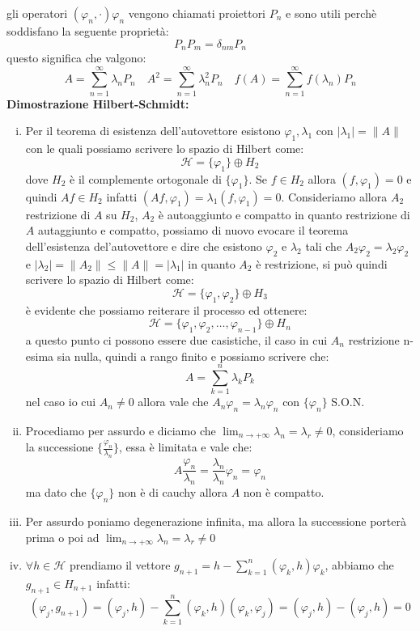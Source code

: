 \documentclass[12pt]{book}
\theoremstyle{plain}
\renewcommand{\H}{\mathcal{H}}
\theoremstyle{definition}
\theoremstyle{remark}
\begin{document}
gli operatori $(\varphi_n,\cdot)\varphi_n$ vengono chiamati proiettori $P_n$ e sono utili perchè soddisfano la seguente proprietà:
\[P_nP_m = \delta_{nm} P_n\]
questo significa che valgono:
\[A = \sum_{n=1}^\infty \lambda_nP_n \quad A^2 = \sum_{n=1}^\infty \lambda_n^2P_n \quad f(A)  = \sum_{n=1}^\infty f(\lambda_n)P_n\]
\textbf{Dimostrazione Hilbert-Schmidt:}
\begin{enumerate}[i.]
\item Per il teorema di esistenza dell'autovettore esistono $\varphi_1,\lambda_1$ con $|\lambda_1| = \|A\|$ con le quali possiamo scrivere lo spazio di Hilbert come:
\[\H = \{\varphi_1\} \oplus H_2\]
dove $H_2$ è il complemente ortogonale di $\{\varphi_1\}$. Se $f\in H_2$ allora $(f,\varphi_1)=0$ e quindi $Af\in H_2$ infatti $(Af,\varphi_1) = \lambda_1(f,\varphi_1) = 0$. Consideriamo allora $A_2$ restrizione di $A$ su $H_2$, $A_2$ è autoaggiunto e compatto in quanto restrizione di $A$ autaggiunto e compatto, possiamo di nuovo evocare il teorema dell'esistenza del'autovettore e dire che esistono $\varphi_2$ e $\lambda_2$ tali che $A_2 \varphi_2 = \lambda_2\varphi_2$ e $|\lambda_2| = \|A_2\| \leq \|A\| = |\lambda_1|$ in quanto $A_2$ è restrizione, si può quindi scrivere lo spazio di Hilbert come:
\[\H = \{\varphi_1,\varphi_2\} \oplus H_3 \]
è evidente che possiamo reiterare il processo ed ottenere:
\[\H =\{\varphi_1,\varphi_2,\dots,\varphi_{n-1}\} \oplus H_{n} \]
a questo punto ci possono essere due casistiche, il caso in cui $A_{n}$ restrizione n-esima sia nulla, quindi a rango finito e possiamo scrivere che:
\[A = \sum_{k=1}^n \lambda_k P_k\]
nel caso io cui $A_n\neq 0$ allora vale che $A_n \varphi_n = \lambda_n \varphi_n$ con $\{\varphi_n\}$ S.O.N.
\item  Procediamo per assurdo e diciamo che $\displaystyle \lim_{n\to +\infty} \lambda_n = \lambda_r \neq 0$, consideriamo la successione $\{\displaystyle\frac{\varphi_n}{\lambda_n}\}$, essa è limitata e vale che:
\[A\frac{\varphi_n}{\lambda_n} = \frac{\lambda_n}{\lambda_n}\varphi_n = \varphi_n\]
ma dato che $\{\varphi_n\}$ non è di cauchy allora $A$ non è compatto.
\item Per assurdo poniamo degenerazione infinita, ma allora la successione porterà prima o poi ad $\displaystyle \lim_{n\to +\infty} \lambda_n = \lambda_r \neq 0$
\item $\forall h\in\H$ prendiamo il vettore $g_{n+1} = h-\displaystyle\sum_{k=1}^n (\varphi_k,h)\varphi_k$, abbiamo che $g_{n+1}\in H_{n+1}$ infatti:
\[(\varphi_j,g_{n+1}) = (\varphi_j,h) - \sum_{k=1}^n (\varphi_k,h)(\varphi_k,\varphi_j) =(\varphi_j,h)-(\varphi_j,h) = 0 \]

\end{enumerate}
\end{document}
